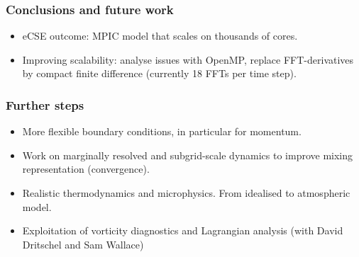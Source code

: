 \documentclass{beamer}
\def\oran#1{\color{orange} #1}
\def\re#1{\color{red}   #1}
\def\bl#1{\color{blue}  #1}
\def\pu#1{\color{purple} #1}
\begin{document}
\begin{frame}
\frametitle{Conclusions and future work}

\begin{itemize}
\item eCSE outcome: MPIC model that scales on thousands of cores.
\item Improving scalability: analyse issues with OpenMP, replace FFT-derivatives by compact finite difference (currently 18 FFTs per time step).  
\end{itemize}

\end{frame}


\begin{frame}
\frametitle{Further steps}

\vspace{0.2cm}
\begin{itemize}
\item More flexible {\pu boundary conditions}, in particular for momentum.
\item Work on {\re marginally resolved and subgrid-scale dynamics} to improve mixing representation (convergence).
\item Realistic {\bl thermodynamics} and {\bl microphysics}. From idealised to atmospheric model.
\item Exploitation of {\oran vorticity diagnostics} and {\oran Lagrangian analysis} (with David Dritschel and Sam Wallace)
\end{itemize}

\centering

\end{frame}

\end{document}
